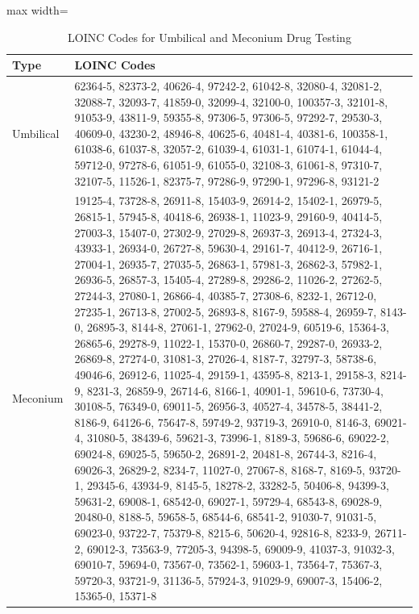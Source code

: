 \begin{table}[thb]
    \caption{LOINC Codes for Umbilical and Meconium Drug Testing}
    \small
    \centering
    \begin{adjustbox}{max width=\textwidth}
    \begin{tabular}{|l|p{14cm}|}
        \hline
        \textbf{Type} & \textbf{LOINC Codes} \\ \hline
        Umbilical & 62364-5, 82373-2, 40626-4, 97242-2, 61042-8, 32080-4,  32081-2, 32088-7, 32093-7, 41859-0, 32099-4, 32100-0, 100357-3, 32101-8, 91053-9, 43811-9, 59355-8, 97306-5, 97306-5, 97292-7, 29530-3, 40609-0, 43230-2, 48946-8, 40625-6, 40481-4, 40381-6, 100358-1, 61038-6, 61037-8, 32057-2, 61039-4, 61031-1, 61074-1, 61044-4, 59712-0, 97278-6, 61051-9, 61055-0, 32108-3, 61061-8, 97310-7, 32107-5, 11526-1, 82375-7, 97286-9, 97290-1, 97296-8, 93121-2 \\ \hline
        Meconium & 19125-4, 73728-8, 26911-8, 15403-9, 26914-2, 15402-1, 26979-5, 26815-1, 57945-8, 40418-6, 26938-1, 11023-9, 29160-9, 40414-5, 27003-3, 15407-0, 27302-9, 27029-8, 26937-3, 26913-4, 27324-3, 43933-1, 26934-0, 26727-8, 59630-4, 29161-7, 40412-9, 26716-1, 27004-1, 26935-7, 27035-5, 26863-1, 57981-3, 26862-3, 57982-1, 26936-5, 26857-3, 15405-4, 27289-8, 29286-2, 11026-2, 27262-5, 27244-3, 27080-1, 26866-4, 40385-7, 27308-6, 
        8232-1, 26712-0, 27235-1, 26713-8, 27002-5, 26893-8, 8167-9, 59588-4, 
        26959-7, 8143-0, 26895-3, 8144-8, 27061-1, 27962-0, 27024-9, 60519-6, 
        15364-3, 26865-6, 29278-9, 11022-1, 15370-0, 26860-7, 29287-0, 26933-2, 26869-8, 27274-0, 31081-3, 27026-4, 8187-7, 32797-3, 58738-6, 49046-6, 
        26912-6, 11025-4, 29159-1, 43595-8, 8213-1, 29158-3, 8214-9, 8231-3, 
        26859-9, 26714-6, 8166-1, 40901-1, 59610-6, 73730-4, 30108-5, 76349-0, 
        69011-5, 26956-3, 40527-4, 34578-5, 38441-2, 8186-9, 64126-6, 75647-8, 
        59749-2, 93719-3, 26910-0, 8146-3, 69021-4, 31080-5, 38439-6, 59621-3, 
        73996-1, 8189-3, 59686-6, 69022-2, 69024-8, 69025-5, 59650-2, 26891-2, 
        20481-8, 26744-3, 8216-4, 69026-3, 26829-2, 8234-7, 11027-0, 27067-8, 
        8168-7, 8169-5, 93720-1, 29345-6, 43934-9, 8145-5, 18278-2, 33282-5, 
        50406-8, 94399-3, 59631-2, 69008-1, 68542-0, 69027-1, 59729-4, 68543-8, 69028-9, 20480-0, 8188-5, 59658-5, 68544-6, 68541-2, 91030-7, 91031-5, 
        69023-0, 93722-7, 75379-8, 8215-6, 50620-4, 92816-8, 8233-9, 26711-2, 
        69012-3, 73563-9, 77205-3, 94398-5, 69009-9, 41037-3, 91032-3, 69010-7, 59694-0, 73567-0, 73562-1, 59603-1, 73564-7, 75367-3, 59720-3, 93721-9, 31136-5, 57924-3, 91029-9, 69007-3, 15406-2, 15365-0, 15371-8 \\
        \hline
    \end{tabular}
    \end{adjustbox}
    \label{loinc_codes}
\end{table}